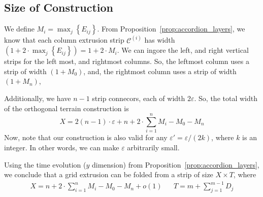 \subsection{Size of Construction}
\label{sec:size}

We define $M_i = \max_j\left\{ E_{ij}\right\}$.
From Proposition~\ref{prop:accordion_layers}, we know that each column extrusion strip
$\mathcal C^{(i)}$ has width $\left( 1 + 2\cdot\max_j\left\{ E_{ij}\right\}\right) = 1+2\cdot M_i$.
We can ingore the left, and right vertical strips for the left most, and rightmost columns.
So, the leftmost column uses a strip of width $(1 + M_0)$,
and, the rightmost column uses a strip of width $(1 + M_n)$,

Additionally, we have $n-1$ strip connecors, each of width $2\varepsilon$.
So, the total width of the orthogonal terrain construction is
$$X = 2(n-1)\cdot\varepsilon + n + 2\cdot\sum\limits_{i=1}^n M_i - M_0 - M_n$$
Now, note that our construction is also valid for any $\varepsilon' = \varepsilon/(2k)$, where $k$ is an integer.
In other words, we can make $\varepsilon$ arbitrarily small.

\begin{theorem}
\label{thm:grid_extrusion}
Using the time evolution ($y$ dimension) from Proposition~\ref{prop:accordion_layers},
we conclude that a grid extrusion can be folded from a strip of size $X\times T$, where
\begin{align}
X = n + 2\cdot\sum\limits_{i=1}^n M_i - M_0 - M_n + o(1) && T = m + \sum\limits^{m-1}_{j=1} D_j
\end{align}
\end{theorem}
